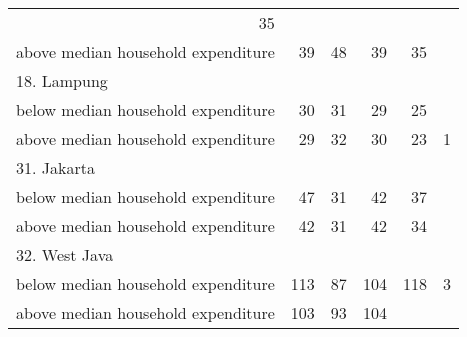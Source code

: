 \begin{table}[!h]
\begin{tabular}{llllll}
  \multicolumn{1}{r}{35} &
  \multicolumn{1}{r}{} \\
\multicolumn{1}{l}{\hspace{1em}above median household expenditure} &
  \multicolumn{1}{|r}{39} &
  \multicolumn{1}{r}{48} &
  \multicolumn{1}{r}{39} &
  \multicolumn{1}{r}{35} &
  \multicolumn{1}{r}{} \\
\multicolumn{1}{l}{18. Lampung} &
  \multicolumn{1}{|r}{} &
  \multicolumn{1}{r}{} &
  \multicolumn{1}{r}{} &
  \multicolumn{1}{r}{} &
  \multicolumn{1}{r}{} \\
\multicolumn{1}{l}{\hspace{1em}below median household expenditure} &
  \multicolumn{1}{|r}{30} &
  \multicolumn{1}{r}{31} &
  \multicolumn{1}{r}{29} &
  \multicolumn{1}{r}{25} &
  \multicolumn{1}{r}{} \\
\multicolumn{1}{l}{\hspace{1em}above median household expenditure} &
  \multicolumn{1}{|r}{29} &
  \multicolumn{1}{r}{32} &
  \multicolumn{1}{r}{30} &
  \multicolumn{1}{r}{23} &
  \multicolumn{1}{r}{1} \\
\multicolumn{1}{l}{31. Jakarta} &
  \multicolumn{1}{|r}{} &
  \multicolumn{1}{r}{} &
  \multicolumn{1}{r}{} &
  \multicolumn{1}{r}{} &
  \multicolumn{1}{r}{} \\
\multicolumn{1}{l}{\hspace{1em}below median household expenditure} &
  \multicolumn{1}{|r}{47} &
  \multicolumn{1}{r}{31} &
  \multicolumn{1}{r}{42} &
  \multicolumn{1}{r}{37} &
  \multicolumn{1}{r}{} \\
\multicolumn{1}{l}{\hspace{1em}above median household expenditure} &
  \multicolumn{1}{|r}{42} &
  \multicolumn{1}{r}{31} &
  \multicolumn{1}{r}{42} &
  \multicolumn{1}{r}{34} &
  \multicolumn{1}{r}{} \\
\multicolumn{1}{l}{32. West Java} &
  \multicolumn{1}{|r}{} &
  \multicolumn{1}{r}{} &
  \multicolumn{1}{r}{} &
  \multicolumn{1}{r}{} &
  \multicolumn{1}{r}{} \\
\multicolumn{1}{l}{\hspace{1em}below median household expenditure} &
  \multicolumn{1}{|r}{113} &
  \multicolumn{1}{r}{87} &
  \multicolumn{1}{r}{104} &
  \multicolumn{1}{r}{118} &
  \multicolumn{1}{r}{3} \\
\multicolumn{1}{l}{\hspace{1em}above median household expenditure} &
  \multicolumn{1}{|r}{103} &
  \multicolumn{1}{r}{93} &
  \multicolumn{1}{r}{104} &

\end{tabular}
\end{table}
